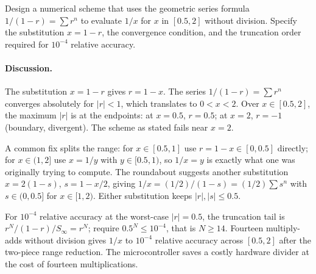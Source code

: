 \begin{exercise}
Design a numerical scheme that uses the geometric series formula $1/(1
- r) = \sum r^{n}$ to evaluate $1/x$ for $x$ in $[0.5, 2]$ without
division. Specify the substitution $x = 1 - r$, the convergence
condition, and the truncation order required for $10^{-4}$ relative
accuracy.

\paragraph{Discussion.} The substitution $x = 1 - r$ gives $r = 1 -
x$. The series $1/(1 - r) = \sum r^{n}$ converges absolutely for
$|r| < 1$, which translates to $0 < x < 2$. Over $x \in [0.5, 2]$,
the maximum $|r|$ is at the endpoints: at $x = 0.5$, $r = 0.5$; at
$x = 2$, $r = -1$ (boundary, divergent). The scheme as stated fails
near $x = 2$.

A common fix splits the range: for $x \in [0.5, 1]$ use $r = 1 - x
\in [0, 0.5]$ directly; for $x \in (1, 2]$ use $x = 1 / y$ with
$y \in [0.5, 1)$, so $1/x = y$ is exactly what one was originally
trying to compute. The roundabout suggests another substitution
$x = 2(1 - s)$, $s = 1 - x/2$, giving $1/x = (1/2)/(1 - s) =
(1/2) \sum s^{n}$ with $s \in (0, 0.5]$ for $x \in [1, 2)$. Either
substitution keeps $|r|, |s| \leq 0.5$.

For $10^{-4}$ relative accuracy at the worst-case $|r| = 0.5$, the
truncation tail is $r^{N}/(1 - r) / S_{\infty} = r^{N}$; require
$0.5^{N} \leq 10^{-4}$, that is $N \geq 14$. Fourteen multiply-adds
without division gives $1/x$ to $10^{-4}$ relative accuracy across
$[0.5, 2]$ after the two-piece range reduction. The microcontroller
saves a costly hardware divider at the cost of fourteen
multiplications.
\end{exercise}

